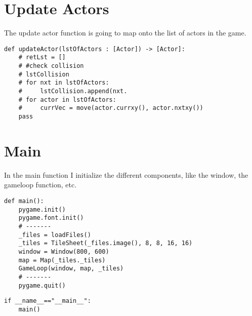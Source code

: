 \documentclass[11pt]{article}
\begin{document}
\section{Update Actors}
\label{sec:org394d52f}

The update actor function is going to map onto the list of actors in the game.

\begin{verbatim}
def updateActor(lstOfActors : [Actor]) -> [Actor]:
    # retLst = []
    # #check collision
    # lstCollision
    # for nxt in lstOfActors:
    #     lstCollision.append(nxt.
    # for actor in lstOfActors:
    #     currVec = move(actor.currxy(), actor.nxtxy())
    pass
\end{verbatim}



\section{Main}
\label{sec:orge58cd1c}

In the main function I initialize the different components, like the window, the gameloop function, etc.

\begin{verbatim}
def main():
    pygame.init()
    pygame.font.init()
    # -------
    _files = loadFiles()
    _tiles = TileSheet(_files.image(), 8, 8, 16, 16)
    window = Window(800, 600)
    map = Map(_tiles._tiles)
    GameLoop(window, map, _tiles)
    # -------
    pygame.quit()
\end{verbatim}



\begin{verbatim}
if __name__=="__main__":
    main()
\end{verbatim}
\end{document}
